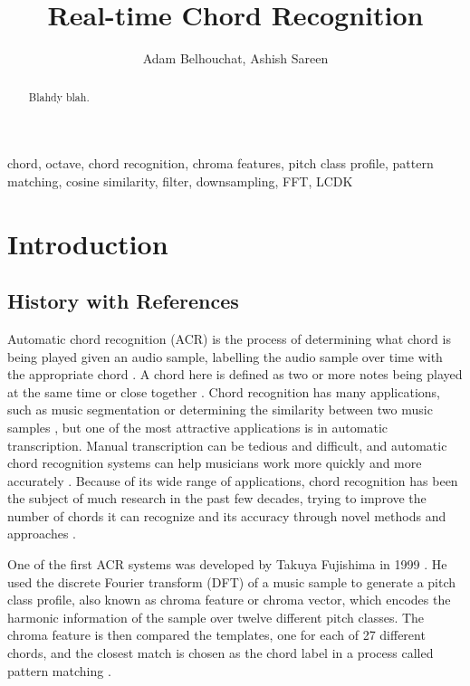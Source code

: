 \documentclass[journal]{IEEEtran}
\begin{document}
\title{Real-time Chord Recognition}
\author{Adam Belhouchat, Ashish Sareen}
\maketitle

\begin{abstract}
    Blahdy blah.
\end{abstract}
\begin{IEEEkeywords}
    chord, octave, chord recognition, chroma features, pitch class profile, pattern matching, cosine similarity, filter, downsampling, FFT, LCDK
\end{IEEEkeywords}

\section{Introduction}
\subsection{History with References}
Automatic chord recognition (ACR) is the process of determining what chord is being played given an audio sample, labelling the audio sample over time with the appropriate chord \cite{stark}.
A chord here is defined as two or more notes being played at the same time or close together \cite{cho}.
Chord recognition has many applications, such as music segmentation or determining the similarity between two music samples \cite{lee}, but one of the most attractive applications is in automatic transcription.
Manual transcription can be tedious and difficult, and automatic chord recognition systems can help musicians work more quickly and more accurately \cite{mauch_thesis}.
Because of its wide range of applications, chord recognition has been the subject of much research in the past few decades, trying to improve the number of chords it can recognize and its accuracy through novel methods and approaches \cite{pauwels}.

One of the first ACR systems was developed by Takuya Fujishima in 1999 \cite{pauwels}.
He used the discrete Fourier transform (DFT) of a music sample to generate a pitch class profile, also known as chroma feature or chroma vector, which encodes the harmonic information of the sample over twelve different pitch classes.
The chroma feature is then compared the templates, one for each of 27 different chords, and the closest match is chosen as the chord label in a process called pattern matching \cite{fujishima}.
\end{document}
